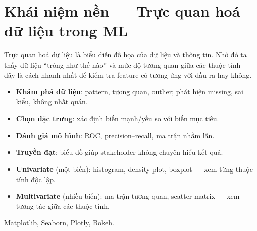 \section{Khái niệm nền --- Trực quan hoá dữ liệu trong ML}
\label{sec:khai-niem-truc-quan}

\begin{dinhnghia}[title={Trực quan hoá dữ liệu (Data Visualization)}]
Trực quan hoá dữ liệu là biểu diễn đồ họa của dữ liệu và thông tin.
Nhờ đó ta thấy dữ liệu ``trông như thế nào'' và mức độ tương quan giữa các thuộc tính --- đây là cách nhanh nhất để kiểm tra feature có tương ứng với đầu ra hay không.
\end{dinhnghia}

\begin{ynghia}[title={Vai trò trong pipeline ML}]
\begin{itemize}
  \item \textbf{Khám phá dữ liệu}: pattern, tương quan, outlier; phát hiện missing, sai kiểu, không nhất quán.
  \item \textbf{Chọn đặc trưng}: xác định biến mạnh/yếu so với biến mục tiêu.
  \item \textbf{Đánh giá mô hình}: ROC, precision--recall, ma trận nhầm lẫn.
  \item \textbf{Truyền đạt}: biểu đồ giúp stakeholder không chuyên hiểu kết quả.
\end{itemize}
\end{ynghia}

\begin{phuongphap}[title={Hai nhóm biểu đồ trong phần này}]
\begin{itemize}
  \item \textbf{Univariate} (một biến): histogram, density plot, boxplot --- xem từng thuộc tính độc lập.
  \item \textbf{Multivariate} (nhiều biến): ma trận tương quan, scatter matrix --- xem tương tác giữa các thuộc tính.
\end{itemize}
\end{phuongphap}

\begin{phuongphap}[title={Thư viện Python thường dùng}]
Matplotlib, Seaborn, Plotly, Bokeh.
\end{phuongphap}

\begin{vidu}[title={Tổng quan kỹ thuật trực quan}]
\end{vidu}
